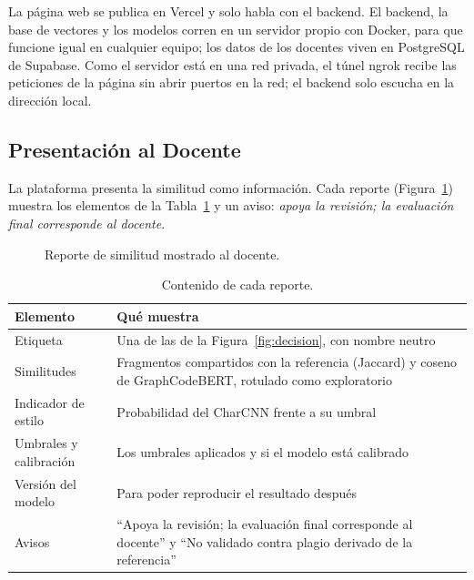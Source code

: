 La página web se publica en Vercel y solo habla con el backend. El backend, la base de vectores y los modelos corren en un servidor propio con Docker, para que funcione igual en cualquier equipo; los datos de los docentes viven en PostgreSQL de Supabase. Como el servidor está en una red privada, el túnel ngrok recibe las peticiones de la página sin abrir puertos en la red; el backend solo escucha en la dirección local.

\subsection{Presentación al Docente}
\label{subsec:presentacion}

La plataforma presenta la similitud como información. Cada reporte (Figura~\ref{fig:captura_reporte}) muestra los elementos de la Tabla~\ref{tab:reporte} y un aviso: \emph{apoya la revisión; la evaluación final corresponde al docente}.

\begin{figure}[H]
    \centering
    \caption{Reporte de similitud mostrado al docente.}
    \label{fig:captura_reporte}
\end{figure}

\begin{table}[H]
    \centering
    \caption{Contenido de cada reporte.}
    \label{tab:reporte}
    \renewcommand{\arraystretch}{1.25}
    \small
    \begin{tabularx}{\textwidth}{|>{\raggedright\arraybackslash}p{4.4cm}|X|}
        \hline
        \textbf{Elemento} & \textbf{Qué muestra} \\ \hline
        Etiqueta & Una de las de la Figura~\ref{fig:decision}, con nombre neutro \\ \hline
        Similitudes & Fragmentos compartidos con la referencia (Jaccard) y coseno de GraphCodeBERT, rotulado como exploratorio \\ \hline
        Indicador de estilo & Probabilidad del CharCNN frente a su umbral \\ \hline
        Umbrales y calibración & Los umbrales aplicados y si el modelo está calibrado \\ \hline
        Versión del modelo & Para poder reproducir el resultado después \\ \hline
        Avisos & ``Apoya la revisión; la evaluación final corresponde al docente'' y ``No validado contra plagio derivado de la referencia'' \\ \hline
    \end{tabularx}
\end{table}

